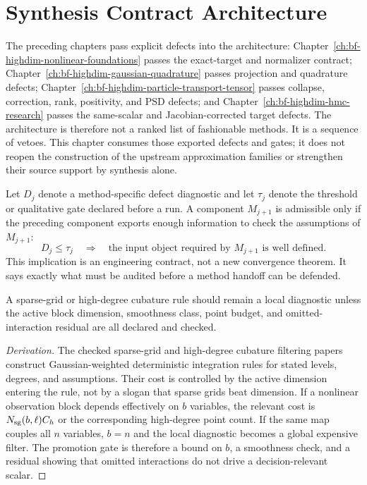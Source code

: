 \section{Synthesis Contract Architecture}
\label{sec:bf-hd-synthesis-architecture}

The preceding chapters pass explicit defects into the architecture:
Chapter~\ref{ch:bf-highdim-nonlinear-foundations} passes the exact-target and
normalizer contract; Chapter~\ref{ch:bf-highdim-gaussian-quadrature} passes
projection and quadrature defects;
Chapter~\ref{ch:bf-highdim-particle-transport-tensor} passes collapse,
correction, rank, positivity, and PSD defects; and
Chapter~\ref{ch:bf-highdim-hmc-research} passes the same-scalar and
Jacobian-corrected target defects.  The architecture is therefore not a ranked
list of fashionable methods.  It is a sequence of vetoes.  This chapter consumes
those exported defects and gates; it does not reopen the construction of the
upstream approximation families or strengthen their source support by synthesis
alone.

Let \(D_j\) denote a method-specific defect diagnostic and let
\(\tau_j\) denote the threshold or qualitative gate declared before a run.  A
component \(M_{j+1}\) is admissible only if the preceding component exports
enough information to check the assumptions of \(M_{j+1}\):
\[
  D_j\le \tau_j
  \quad\Longrightarrow\quad
  \text{the input object required by }M_{j+1}\text{ is well defined.}
  \label{eq:bf-hd-contract-handoff}
\]
This implication is an engineering contract, not a new convergence theorem.
It says exactly what must be audited before a method handoff can be defended.

\begin{proposition}
\label{prop:bf-hd-sparse-grid-promotion}
A sparse-grid or high-degree cubature rule should remain a local diagnostic
unless the active block dimension, smoothness class, point budget, and
omitted-interaction residual are all declared and checked.
\end{proposition}

\begin{proof}[Derivation]
The checked sparse-grid and high-degree cubature filtering papers construct
Gaussian-weighted deterministic integration rules for stated levels, degrees,
and assumptions.  Their cost is controlled by the active dimension entering the
rule, not by a slogan that sparse grids beat dimension.  If a nonlinear
observation block depends effectively on \(b\) variables, the relevant cost is
\(N_{\rm sg}(b,\ell)C_h\) or the corresponding high-degree point count.  If
the same map couples all \(n\) variables, \(b=n\) and the local diagnostic
becomes a global expensive filter.  The promotion gate is therefore a bound on
\(b\), a smoothness check, and a residual showing that omitted interactions do
not drive a decision-relevant scalar.
\end{proof}

